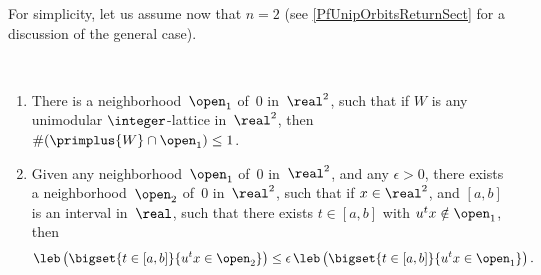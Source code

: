 For simplicity, let us assume now that $n = 2$ (see \cref{PfUnipOrbitsReturnSect} for a discussion of the general case).

\begin{lem} \label{SmallPrimsInUnimodLatt} \ 
\noprelistbreak
	\begin{enumerate}
	\item \label{SmallPrimsInUnimodLatt-1}
There is a neighborhood~$\open_1$ of\/~$0$ in\/~$\real^2$, such that if $W$ is any unimodular $\integer$-lattice in\/~$\real^2$, then\/ $\# \!\left(\primplus{W} \cap \open_1\right) \le 1$.
	\item \label{SmallPrimsInUnimodLatt-compare}
Given any neighborhood~$\open_1$ of\/~$0$ in\/~$\real^2$, and any $\epsilon > 0$, there exists a neighborhood~$\open_2$ of\/~$0$ in\/~$\real^2$, such that if $x \in \real^2$, and\/ $[a,b]$ is an interval in\/~$\real$, such that there exists $t \in [a,b]$ with $u^t x \notin \open_1$, then
		$$ \leb \left( \bigset{ t \in [a,b] }{ u^t x \in \open_2 } \right) 
		\le \epsilon \, \leb \left( \bigset{ t \in [a,b] }{ u^t  x \in \open_1 } \right) . $$
	\end{enumerate}
\end{lem}

